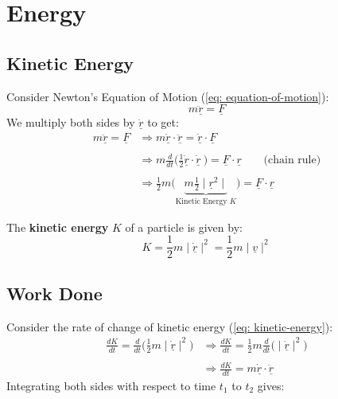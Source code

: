 \section{Energy}
\subsection{Kinetic Energy}
Consider Newton's Equation of Motion (\ref{eq: equation-of-motion}):
$$m\underline{\ddot{r}} = \underline{F}$$
We multiply both sides by $\underline{\dot{r}}$ to get:
$$\begin{aligned} m\underline{\ddot{r}} = \underline{F} & \Rightarrow  m\underline{\dot{r}} \cdot \underline{\ddot{r}} =\underline{\dot{r}}\cdot \underline{F}                                                                  \\ \\
                                                      & \Rightarrow m\frac{d}{dt}\Big(\frac{1}{2}\underline{\dot{r}} \cdot\underline{\dot{r}}\ \Big)=\underline{F} \cdot{\underline{r}} \ \ \ \ \ \ \ \ \ \text{(chain rule)} \\ \\
                                                      & \Rightarrow \frac{1}{2} m\Big(\underbrace{m\frac{1}{2}\mid\underline{r}^{2} \mid}_{\text{Kinetic Energy } K}\Big)= \underline{F}\cdot \underline{r}\end{aligned}$$

\begin{definition}
	The {\bf kinetic energy} $K$ of a particle is given by:
	\begin{equation}
		\label{eq: kinetic-energy}
		K = \frac{1}{2}m\mid\underline{\dot{r}}\mid^{2} = \frac{1}{2}m\mid\underline{v}\mid^{2}
	\end{equation}
\end{definition}

\subsection{Work Done}
Consider the rate of change of kinetic energy (\ref{eq: kinetic-energy}):
$$\begin{aligned} \frac{dK}{dt} = \frac{d}{dt}\Big(\frac{1}{2}m\mid\underline{\dot{r}}\mid^{2}\Big) & \Rightarrow \frac{dK}{dt} = \frac{1}{2}m\frac{d}{dt}\Big(\mid\underline{\dot{r}}\mid^{2}\Big) \\ \\
                                                                                                  & \Rightarrow \frac{dK}{dt} = m\underline{\dot{r}}\cdot\underline{\ddot{r}}\end{aligned}$$
Integrating both sides with respect to time $t_1$ to $t_2$ gives:

